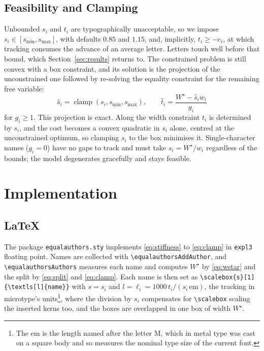 \documentclass[10pt,twocolumn]{article}
\newcommand{\tex}{\lstinline[style=latex]}
\newcommand{\code}{\lstinline}
\theoremstyle{plain}
\theoremstyle{definition}
\begin{document}
  \subsection{Feasibility and Clamping}
  Unbounded $s_i$ and $t_i$ are typographically unacceptable, so we impose $s_i \in [s_{\min}, s_{\max}]$, with defaults $0.85$ and $1.15$, and, implicitly, $t_i \ge -e_i$, at which tracking consumes the advance of an average letter.
  Letters touch well before that bound, which Section~\ref{sec:results} returns to.
  The constrained problem is still convex with a box constraint, and its solution is the projection of the unconstrained one followed by re-solving the equality constraint for the remaining free variable:
  \begin{equation}
    \hat s_i = \operatorname{clamp}(s_i, s_{\min}, s_{\max}), \qquad \hat t_i = \frac{W^\star - \hat s_i w_i}{g_i}
    \label{eq:clamp}
  \end{equation}
  for $g_i \ge 1$.
  This projection is exact.
  Along the width constraint $t_i$ is determined by $s_i$, and the cost becomes a convex quadratic in $s_i$ alone, centred at the unconstrained optimum, so clamping $s_i$ to the box minimises it.
  Single-character names ($g_i = 0$) have no gaps to track and must take $s_i = W^\star / w_i$ regardless of the bounds; the model degenerates gracefully and stays feasible.

  \section{Implementation}
  \label{sec:impl}
  \subsection{\LaTeX}
  \label{sec:latex}
  The package \code|equalauthors.sty| implements \eqref{eq:stiffness} to \eqref{eq:clamp} in \code|expl3| floating point.
  Names are collected with \tex|\equalauthorsAddAuthor|, and \tex|\equalauthorsAuthors| measures each name and computes $W^\star$ by \eqref{eq:wstar} and the split by \eqref{eq:split} and \eqref{eq:clamp}.
  Each name is then set as \tex|\scalebox{s}[1]{\textls[l]{name}}| with $s = s_i$ and $l = \ell_i = 1000\,t_i/(s_i\,\mathrm{em})$, the tracking in microtype's units\footnote{The $\mathrm{em}$ is the length named after the letter M, which in metal type was cast on a square body and so measures the nominal type size of the current font.}, where the division by $s_i$ compensates for \tex|\scalebox| scaling the inserted kerns too, and the boxes are overlapped in one box of width $W^\star$.
\end{document}
